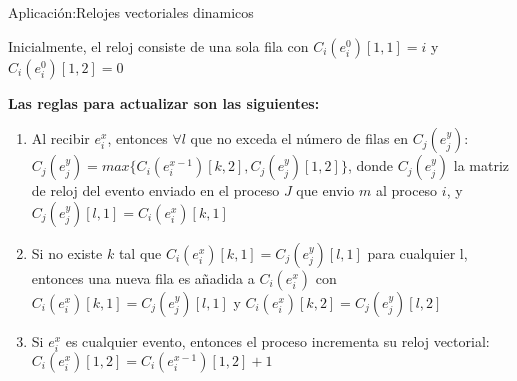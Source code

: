 \begin{frame}[fragile]{Aplicación:}{Relojes vectoriales dinamicos}
    \justifying

    Inicialmente, el reloj consiste de una sola fila con $C_i(e_i^0)[1,1]=i$ y $C_i(e_i^0)[1,2]=0$

    \textbf{Las reglas para actualizar son las siguientes:} 
    
    \begin{enumerate}
        \item Al recibir $e_i^x$, entonces $\forall l$ que no exceda el número de filas en $C_j(e_j^y)$: $C_j(e_j^y) = max\{C_i(e_i^{x-1})[k,2], C_j(e_j^y)[1,2]\}$, donde $C_j(e_j^y)$ la matriz de reloj del evento enviado en el proceso $J$ que envio $m$ al proceso $i$, y $C_j(e_j^y)[l,1]=C_i(e_i^x)[k,1]$
        
        \item Si no existe $k$ tal que $C_i(e_i^x)[k,1] = C_j(e_j^y)[l,1]$ para cualquier l, entonces una nueva fila es añadida a $C_i(e_i^x)$ con $C_i(e_i^x)[k,1] = C_j(e_j^y)[l,1]$ y $C_i(e_i^x)[k,2] = C_j(e_j^y)[l,2]$
        
        \item Si $e_i^x$ es cualquier evento, entonces el proceso incrementa su reloj vectorial: $C_i(e_i^x)[1,2] = C_i(e_i^{x-1})[1,2]+1$

  \end{enumerate}
\end{frame}